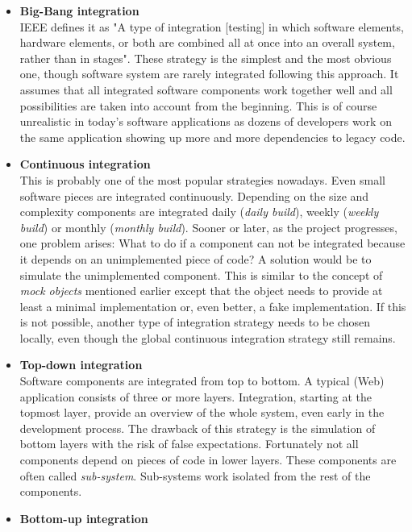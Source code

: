 \documentclass[12pt, notitlepage]{article}
\begin{document}
\begin{itemize}
	\item \textbf{Big-Bang integration}\\
	IEEE defines it as\cite{ieee-definition} "A type of integration [testing] in which software elements, hardware elements, or both are combined all at once into an overall system, rather than in stages". These strategy is the simplest and the most obvious one, though software system are rarely integrated following this approach. It assumes that all integrated software components work together well and all possibilities are taken into account from the beginning. This is of course
unrealistic in today's software applications as dozens of developers work on the same application showing up more and more dependencies to legacy code. 
	\item \textbf{Continuous integration}\\
	This is probably one of the most popular strategies nowadays. Even small software pieces are integrated continuously. Depending on the 
	size and complexity components are integrated daily (\textit{daily build}), weekly (\textit{weekly build}) or monthly (\textit{monthly build}). 
	Sooner or later, as the project progresses, one problem arises: What to do if a component can not be integrated because it depends on an unimplemented 
	piece of code? A solution would be to simulate the unimplemented component. This is similar to the concept of \textit{mock objects} mentioned earlier 
	except that the object needs to provide at least a minimal implementation or, even better, a fake implementation. If this is not possible, another type of integration 
	strategy needs to be chosen locally, even though the global continuous integration strategy still remains. 
\item \textbf{Top-down integration}\\
	Software components are integrated from top to bottom. A typical (Web) application consists of three or more layers. Integration, starting at the topmost layer,
	provide an overview of the whole system, even early in the development process. The drawback of this strategy is the simulation of bottom layers with the risk
	of false expectations. Fortunately not all components depend on pieces of code in lower layers. These components are often called
	\textit{sub-system}\cite{sw-testing-quality-assurance}. Sub-systems work isolated from the rest of the components. 
	\item \textbf{Bottom-up integration}\\

\end{itemize}
\end{document}
